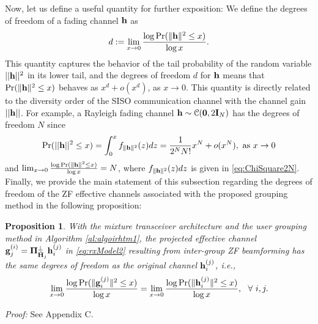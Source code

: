 \documentclass[11pt, draft, onecolumn ]{IEEEtran}
\newtheorem{proposition}{Proposition}
\begin{document}
Now, let us define a useful quantity for further exposition:  We define the degrees of freedom of a fading channel ${\bf h}$  as
\begin{equation}
d:= \lim_{x \rightarrow 0} \frac{  \log \mathrm{Pr} ( \|{\bf h}\|^2  \leq x )}{ \log x}.
\end{equation}
This quantity captures the behavior of the tail probability of the random variable $||{\bf h}||^2$ in its lower tail, and the degrees of freedom $d$ for ${\bf h}$ means that $\mathrm{Pr} ( \|{\bf h}\|^2  \leq x )$ behaves as $x^{d}+o(x^{d})$, as $x\rightarrow 0$. This quantity is directly related to the diversity order of the SISO communication  channel with the channel gain $||{\bf h}||$. For example, a Rayleigh fading channel ${\bf h} \sim {\cal C}({\mathbf{0}},2{\bf I}_N)$ has the degrees of freedom $N$ since
\begin{equation}  \label{eq:PropDistibutionPr}
\mathrm{Pr} ( ||{\bf h}||^2 \le x) = \int_0^x  f_{\|{\bf h}\|^2}(z) dz = \frac{1}{2^N N!}x^N + o(x^N), ~\mbox{as}~x\rightarrow 0
\end{equation}
and
$\lim_{x \rightarrow 0} \frac{  \log \mathrm{Pr} ( \|{\bf h}\|^2  \leq x )}{ \log x} = N$,
where $f_{\|{\bf h}\|^2}(z) dz$ is given in \eqref{eq:ChiSquare2N}.
Finally, we provide the main statement of this subsection regarding the degrees of freedom of the ZF effective channels associated with the proposed grouping method in the following proposition:



\begin{proposition} \label{pro:distribution}
With the {}{mixture} transceiver architecture and the user grouping method in Algorithm \ref{al:algoirhtm1}, the  projected effective channel ${\bf g}_j^{(i)} = {\bf \Pi}_{\tilde{{\bf H}}_j}^\bot {\bf h}_i^{(j)}$ in \eqref{eq:rxModel2} resulting from inter-group ZF beamforming has the same degrees of freedom as the original channel ${\bf h}_i^{(j)}$, i.e.,
\begin{equation}  \label{eq:PropDistMain}
    \lim_{x \rightarrow 0} \frac{  \log \mathrm{Pr} ( \|{\bf g}_i^{(j)}\|^2  \leq x )}{ \log x} = \lim_{x \rightarrow 0} \frac{  \log \mathrm{Pr} ( \|{\bf h}_i^{(j)}\|^2  \leq x )}{ \log x}, ~~\forall~i,j.
\end{equation}
\end{proposition}

{\em Proof:} See Appendix C.
\end{document}
